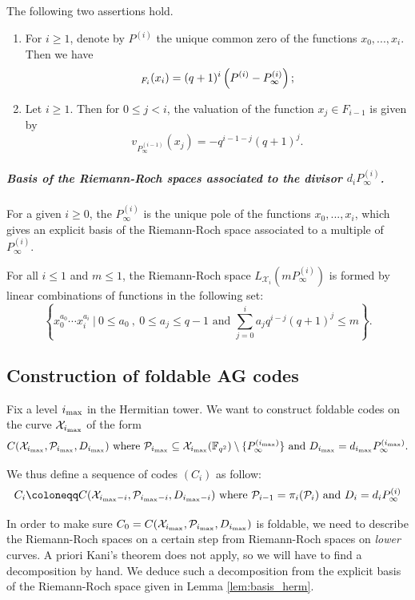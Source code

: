 \documentclass[a4paper,USenglish,autoref]{lipics-v2021}
\newcommand\F{\mathbb{F}}
\let\div\relax\DeclareMathOperator{\div}{div}
\newcommand\calX{\mathcal{X}}
\newcommand\calP{\mathcal{P}}
\newcommand\mydef{\coloneqq}
\newcommand{\ii}{i_{\rm{max}}}
\begin{document}
\begin{lemma} \label{lem:div-princ} The following two assertions hold.
	\begin{enumerate}
		\item For $i \geq 1$, denote by $P^{(i)}$ the unique common zero of the functions $x_0,...,x_i$. Then we have
		\[\div_{F_i}(x_i) = (q+1)^i \left(P^{(i)} - P_{\infty}^{(i)}\right);\]
		\item Let $i \geq 1$. Then for $0 \leq j < i$, the valuation of the function $x_j \in F_{i-1}$ is given by
		\[v_{P_{\infty}^{(i-1)}}(x_j) = - q^{i-1-j}(q+1)^j.\]
	\end{enumerate}
\end{lemma}

\subparagraph*{Basis of the Riemann-Roch spaces associated to the divisor $d_i P_\infty^{(i)}$.}

For a given $i \geq 0$, the $P^{(i)}_{\infty}$ is the unique pole of the functions $x_0,...,x_i$, which gives an explicit basis of the Riemann-Roch space associated to a multiple of $P^{(i)}_{\infty}$.

\begin{lemma}\label{lem:basis_herm}
	For all $i \leq 1$ and $m \leq 1$, the Riemann-Roch space $L_{\calX_i}(mP^{(i)}_{\infty})$ is formed by linear combinations of functions in the following set:
	\[\left\{x_0^{a_0} \cdots x_i^{a_i} \ | \ 0 \leq a_0 \ , \ 0 \leq a_j \leq q-1 \text{ and } \sum\limits_{j=0}^i a_jq^{i-j}(q+1)^j \leq m \right\}.\]
\end{lemma}

\subsection{Construction of foldable AG codes}

Fix a level $\ii$ in the Hermitian tower. We want to construct foldable codes on the curve $\calX_{\ii}$ of the form 
\[C(\calX_{\ii},\calP_{\ii},D_{\ii}) \text{ where } \calP_{\ii} \subseteq \calX_{\ii}(\F_{q^2}) \setminus \{P_\infty^{(\ii)}\} \text{ and } D_{\ii} = d_{\ii}P^{(\ii)}_{\infty}.\]

We thus define a sequence of codes $(C_i)$ as follow:
\[C_i \mydef C(\calX_{\ii-i},\calP_{\ii-i},D_{\ii-i}) \text{ where } \calP_{i-1}=\pi_i(\calP_i)\text{ and } D_i = d_iP^{(i)}_{\infty} \]

In order to make sure $C_0=C(\calX_{\ii},\calP_{\ii},D_{\ii})$ is foldable, we need to describe the Riemann-Roch spaces on a certain step from Riemann-Roch spaces on \emph{lower} curves. A priori Kani's theorem does not apply, so we will have to find a decomposition by hand. We deduce such a decomposition  from the explicit basis of the Riemann-Roch space given in Lemma \ref{lem:basis_herm}.
\end{document}
